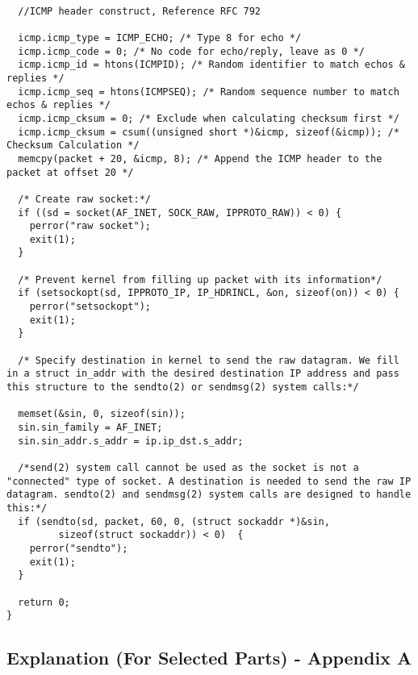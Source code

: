 \documentclass[a4paper,12pt]{article}
\begin{document}
\begin{verbatim}
  
  //ICMP header construct, Reference RFC 792
  
  icmp.icmp_type = ICMP_ECHO; /* Type 8 for echo */
  icmp.icmp_code = 0; /* No code for echo/reply, leave as 0 */
  icmp.icmp_id = htons(ICMPID); /* Random identifier to match echos & replies */
  icmp.icmp_seq = htons(ICMPSEQ); /* Random sequence number to match echos & replies */
  icmp.icmp_cksum = 0; /* Exclude when calculating checksum first */
  icmp.icmp_cksum = csum((unsigned short *)&icmp, sizeof(&icmp)); /* Checksum Calculation */
  memcpy(packet + 20, &icmp, 8); /* Append the ICMP header to the packet at offset 20 */
  
  /* Create raw socket:*/
  if ((sd = socket(AF_INET, SOCK_RAW, IPPROTO_RAW)) < 0) {
    perror("raw socket");
    exit(1);
  }
  
  /* Prevent kernel from filling up packet with its information*/
  if (setsockopt(sd, IPPROTO_IP, IP_HDRINCL, &on, sizeof(on)) < 0) {
    perror("setsockopt");
    exit(1);
  }
  
  /* Specify destination in kernel to send the raw datagram. We fill in a struct in_addr with the desired destination IP address and pass this structure to the sendto(2) or sendmsg(2) system calls:*/
  
  memset(&sin, 0, sizeof(sin));
  sin.sin_family = AF_INET;
  sin.sin_addr.s_addr = ip.ip_dst.s_addr;
  
  /*send(2) system call cannot be used as the socket is not a "connected" type of socket. A destination is needed to send the raw IP datagram. sendto(2) and sendmsg(2) system calls are designed to handle this:*/
  if (sendto(sd, packet, 60, 0, (struct sockaddr *)&sin, 
	     sizeof(struct sockaddr)) < 0)  {
    perror("sendto");
    exit(1);
  }
  
  return 0;
}
\end{verbatim}
\newpage

\restoregeometry
\subsection{Explanation (For Selected Parts) - Appendix A}
\end{document}
